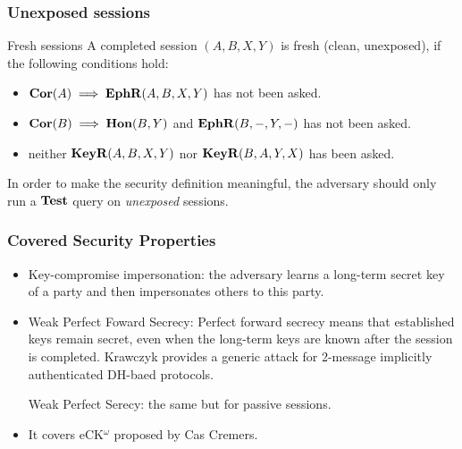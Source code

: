 \documentclass[notes,page number]{beamer}
\begin{document}
\begin{frame}
  \frametitle{Unexposed sessions}

  \begin{block}{Fresh sessions} A completed session $(A,B,X,Y)$ is fresh (clean,
    unexposed), if the following conditions hold:
    \begin{itemize}
    \item $\mathbf{Cor}({A})\implies \mathbf{EphR}({A},{B},X,Y)$
      has not been asked.
    \item $\mathbf{Cor}({B})\implies \mathbf{Hon}({B},Y)$ and
      $\mathbf{EphR}({B},-,Y,-)$ has not been asked.
    \item neither $\mathbf{KeyR}({A},{B},X,Y)$ nor
      $\mathbf{KeyR}({B},{A},Y,X)$ has been asked.
    \end{itemize}
  \end{block}
 In order to make the security definition meaningful, the adversary should
only run a $\mathbf{Test}$ query on {\sl unexposed} sessions. 
\end{frame}
\begin{frame}
  \frametitle{Covered Security Properties}
\begin{itemize}
\item Key-compromise impersonation:  the adversary learns a
long-term secret key of a party and then impersonates others to this party.
\item Weak Perfect Foward Secrecy: Perfect forward secrecy means that
  established keys remain secret, even when the long-term keys are known
  after the session is completed. Krawczyk provides a generic attack
  for 2-message implicitly authenticated DH-baed protocols.

   Weak Perfect Serecy: the same but for passive sessions.
\item It covers eCK$^{\omega}$ proposed by Cas Cremers.
\end{itemize}
\end{frame}
\end{document}
